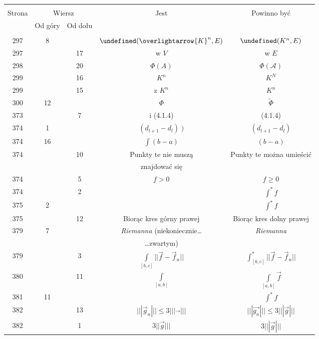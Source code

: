 \documentclass[a4paper]{article}
\newcommand{\mb}{\mathbb}
\let\L\undefined
\newcommand{\L}{\mb{L}}
\newcommand{\ola}{\overlightarrow}
\begin{document}
\begin{center}
  \begin{tabular}{|c|c|c|c|c|}
    \hline
    & \multicolumn{2}{c|}{} & & \\
    Strona & \multicolumn{2}{c|}{Wiersz}& Jest & Powinno być \\ \cline{2-3}
    & Od góry & Od dołu &  &  \\ \hline
    & & & & \\
    297 & 8 & & $\L( \ola{ K }^{ n }, E )$ & $\L( K^{ n }, E )$ \\
    297 & & 17 & w $V$ & w $E$ \\
    298 & & 20 & $\Phi( A )$ & $\Phi( \mathcal{A} )$ \\
    299 & & 16 & $K^{ n }$ & $K^{ N }$ \\
    299 & & 15 & z $K^{ n }$ & $K^{ n }$ \\
    300 & 12 & & $\Phi$ & $\tilde{ \Phi }$ \\
    373 & & 7 & i (4.1.4) & (4.1.4) \\
    374 & 1 & & $( d_{ l + 1 } - d_{ l } )\; )$
           & $( d_{ l + 1 } - d_{ l } )$ \\
    374 & 16 & & $\int ( b - a )$ & $( b - a )$ \\
    374 & & 10 & Punkty te nie muszą & Punkty te można umieścić \\
    & & & znajdować się & \\
    374 & & 5 & $f > 0$ & $f \geq 0$ \\
    374 & & 2 & & $\int^{ * } \! f$ \\
    375 & 2 & & & $\int^{ * } \! f$ \\
    375 & & 12 & Biorąc kres górny prawej & Biorąc kres dolny prawej \\
    379 & 7 & & \emph{Riemanna} (niekoniecznie\ldots & \emph{Riemanna} \\
    & & &  \ldots zwartym) & \\
    379 & & 3 & $\int\limits_{ [ b, c ]  } || \vec{ f }
                - \vec{ f }_{ n } ||$
           & $\int^{ * }_{ [ b, c ]  } || \vec{ f } - \vec{ f }_{ n } ||$ \\
    380 & & 11 & $\int\limits_{ [ a, b ] }$ & $\int\limits_{ [ a, b ] }
                                              \vec{ f } $ \\
    381 & 11 & & & $\int^{ * } \! f$ \\
    382 & & 13 & $||| \vec g_{ n } ||| \leq 3 ||| \vec{ \; \; } |||$
           & $||| \vec{ g_{ n } } ||| \leq 3 ||| \vec{ g } |||$ \\
    382 & & 1 & $3 || \vec{ g } |||$ & $3 ||| \vec{ g } |||$ \\

\end{tabular}
\end{center}
\end{document}

